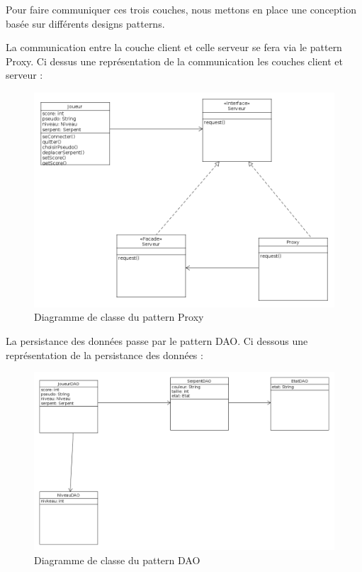 \par
Pour faire communiquer ces trois couches, nous mettons en place une conception basée sur différents designs patterns. \\

\par
La communication entre la couche client et celle serveur se fera via le pattern Proxy. Ci dessus une représentation de la communication les couches client et serveur :
\begin{figure}[!h]
	\centering
	\includegraphics[scale = 0.40]{img/diagProxy.png}
	\caption{Diagramme de classe du pattern Proxy}
\end{figure}
\newpage

\par
La persistance des données passe par le pattern DAO. Ci dessous une représentation de la persistance des données :
\begin{figure}[!h]
	\centering
	\includegraphics[scale = 0.40]{img/diagDAO.png}
	\caption{Diagramme de classe du pattern DAO}
\end{figure}


